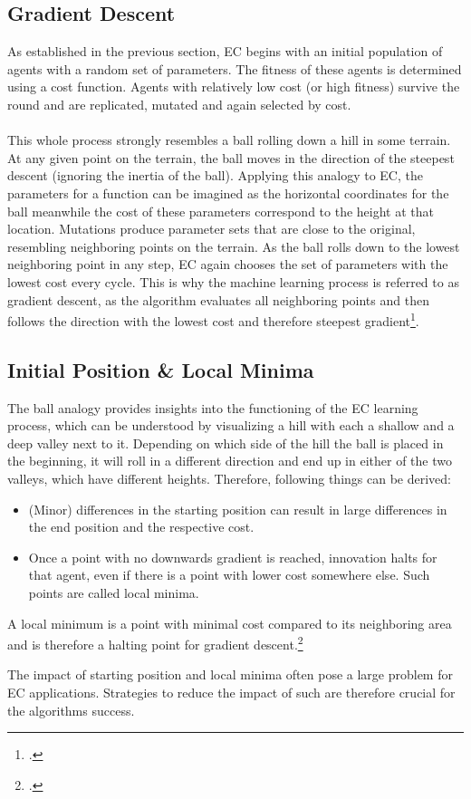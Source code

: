 \documentclass[11pt]{report}
\newcommand{\mydeflabel}{}
\newenvironment{mydef}[1]
{\renewcommand\mydeflabel{#1}\begin{mydefinner}}
{\end{mydefinner}}
\begin{document}
    \subsection{Gradient Descent}\label{subsec:gradient-descent}
    As established in the previous section, EC begins with an initial population of agents with a random set of parameters.
    The fitness of these agents is determined using a cost function.
    Agents with relatively low cost (or high fitness) survive the round and are replicated, mutated and again selected by cost.
    \\ \\
    This whole process strongly resembles a ball rolling down a hill in some terrain.
    At any given point on the terrain, the ball moves in the direction of the steepest descent (ignoring the inertia of the ball).
    Applying this analogy to EC, the parameters for a function can be imagined as the horizontal coordinates for the ball meanwhile the cost of these parameters correspond to the height at that location.
    Mutations produce parameter sets that are close to the original, resembling neighboring points on the terrain.
    As the ball rolls down to the lowest neighboring point in any step, EC again chooses the set of parameters with the lowest cost every cycle.
    This is why the machine learning process is referred to as gradient descent, as the algorithm evaluates all neighboring points and then follows the direction with the lowest cost and therefore steepest gradient\footcite{ibm2024}.

    \subsection{Initial Position \& Local Minima}\label{subsec:initial-position-&-local-minima}
    The ball analogy provides insights into the functioning of the EC learning process, which can be understood by visualizing a hill with each a shallow and a deep valley next to it.
    Depending on which side of the hill the ball is placed in the beginning, it will roll in a different direction and end up in either of the two valleys, which have different heights.
    Therefore, following things can be derived:
    \begin{itemize}
        \item (Minor) differences in the starting position can result in large differences in the end position and the respective cost.
        \item Once a point with no downwards gradient is reached, innovation halts for that agent, even if there is a point with lower cost somewhere else.
        Such points are called local minima.
    \end{itemize}
    \begin{mydef}{Local Minimum}
        A local minimum is a point with minimal cost compared to its neighboring area and is therefore a halting point for gradient descent.\footcite{ayoosh2024}
    \end{mydef}
    The impact of starting position and local minima often pose a large problem for EC applications.
    Strategies to reduce the impact of such are therefore crucial for the algorithms success.
\end{document}
